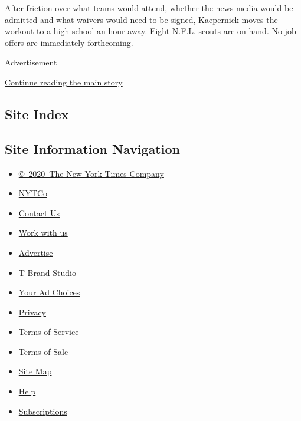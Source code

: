 After friction over what teams would attend, whether the news media
would be admitted and what waivers would need to be signed, Kaepernick
\href{https://www.nytimes.com/2019/11/16/sports/football/colin-kaepernick-nfl-workout.html}{moves
the workout} to a high school an hour away. Eight N.F.L. scouts are on
hand. No job offers are
\href{https://www.nytimes.com/2019/11/17/sports/football/colin-kaepernick-workout.html}{immediately
forthcoming}.

Advertisement

\protect\hyperlink{after-bottom}{Continue reading the main story}

\hypertarget{site-index}{%
\subsection{Site Index}\label{site-index}}

\hypertarget{site-information-navigation}{%
\subsection{Site Information
Navigation}\label{site-information-navigation}}

\begin{itemize}
\tightlist
\item
  \href{https://help.nytimes.com/hc/en-us/articles/115014792127-Copyright-notice}{©~2020~The
  New York Times Company}
\end{itemize}

\begin{itemize}
\tightlist
\item
  \href{https://www.nytco.com/}{NYTCo}
\item
  \href{https://help.nytimes.com/hc/en-us/articles/115015385887-Contact-Us}{Contact
  Us}
\item
  \href{https://www.nytco.com/careers/}{Work with us}
\item
  \href{https://nytmediakit.com/}{Advertise}
\item
  \href{http://www.tbrandstudio.com/}{T Brand Studio}
\item
  \href{https://www.nytimes.com/privacy/cookie-policy\#how-do-i-manage-trackers}{Your
  Ad Choices}
\item
  \href{https://www.nytimes.com/privacy}{Privacy}
\item
  \href{https://help.nytimes.com/hc/en-us/articles/115014893428-Terms-of-service}{Terms
  of Service}
\item
  \href{https://help.nytimes.com/hc/en-us/articles/115014893968-Terms-of-sale}{Terms
  of Sale}
\item
  \href{https://spiderbites.nytimes.com}{Site Map}
\item
  \href{https://help.nytimes.com/hc/en-us}{Help}
\item
  \href{https://www.nytimes.com/subscription?campaignId=37WXW}{Subscriptions}
\end{itemize}

